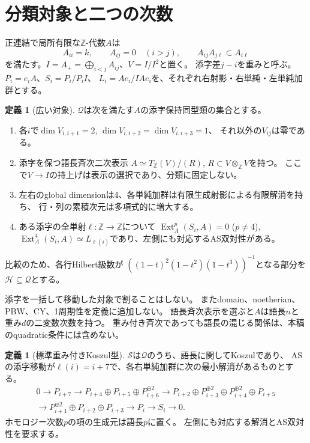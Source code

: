 \documentclass[11pt,a4paper]{ltjsarticle}
\theoremstyle{definition}
\newtheorem{definition}[theorem]{定義}
\newcommand{\ZZ}{\mathbb Z}
\newcommand{\Ext}{\operatorname{Ext}}
\begin{document}
\section{分類対象と二つの次数}
正連結で局所有限な$\ZZ$-代数$A$は
\[
A_{ii}=k,\qquad A_{ij}=0\quad(i>j),\qquad
A_{ij}A_{j\ell}\subset A_{i\ell}
\]
を満たす。$I=A_+=\bigoplus_{i<j}A_{ij}$、$V=I/I^2$と置く。
添字差$j-i$を重みと呼ぶ。$P_i=e_iA$、$S_i=P_i/P_iI$、
$L_i=Ae_i/IAe_i$を、それぞれ右射影・右単純・左単純加群とする。

\begin{definition}[広い対象]\label{def:target}
$\mathcal Q$は次を満たす$A$の添字保持同型類の集合とする。
\begin{enumerate}
\item 各$i$で$\dim V_{i,i+1}=2$, $\dim V_{i,i+2}=\dim V_{i,i+3}=1$、
それ以外の$V_{ij}$は零である。
\item 添字を保つ語長斉次二次表示
$A\simeq T_{\ZZ}(V)/(R)$, $R\subset V\otimes_{\ZZ}V$を持つ。
ここで$V\to I$の持上げは表示の選択であり、分類に固定しない。
\item 左右のglobal dimensionは4、各単純加群は有限生成射影による有限解消を持ち、
行・列の累積次元は多項式的に増大する。
\item ある添字の全単射$\ell:\ZZ\to\ZZ$について
$\Ext_A^p(S_i,A)=0$ ($p\ne4$),
$\Ext_A^4(S_i,A)\simeq L_{\ell(i)}$であり、左側にも対応するAS双対性がある。
\end{enumerate}
比較のため、各行Hilbert級数が
$((1-t)^2(1-t^2)(1-t^3))^{-1}$となる部分を$\mathcal H\subseteq\mathcal Q$とする。
\end{definition}
添字を一括して移動した対象で割ることはしない。
またdomain、noetherian、PBW、CY、1周期性を定義に追加しない。
語長斉次表示を選ぶと$A$は語長$n$と重み$d$の二変数次数を持つ。
重み付き斉次であっても語長の混じる関係は、本稿のquadratic条件には含めない。

\begin{definition}[標準重み付きKoszul型]\label{def:standard}
$\mathcal S$は$\mathcal Q$のうち、語長に関してKoszulであり、
ASの添字移動が$\ell(i)=i+7$で、各右単純加群に次の最小解消があるものとする。
\begin{equation}\label{eq:resolution}
\begin{gathered}
0\longrightarrow P_{i+7}\longrightarrow
P_{i+4}\oplus P_{i+5}\oplus P_{i+6}^{\oplus2}\longrightarrow
P_{i+2}\oplus P_{i+3}^{\oplus2}\oplus P_{i+4}^{\oplus2}\oplus P_{i+5}\\
\longrightarrow P_{i+1}^{\oplus2}\oplus P_{i+2}\oplus P_{i+3}
\longrightarrow P_i\longrightarrow S_i\longrightarrow0.
\end{gathered}
\end{equation}
ホモロジー次数$p$の項の生成元は語長$p$に置く。
左側にも対応する解消とAS双対性を要求する。
\end{definition}
\end{document}
